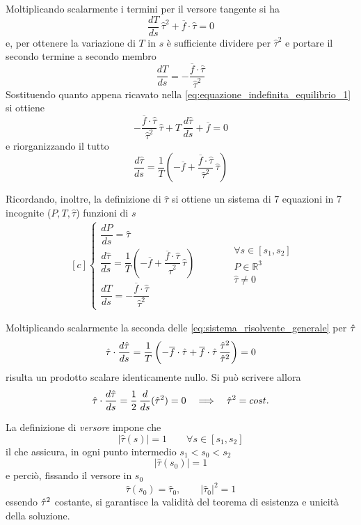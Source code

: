 Moltiplicando scalarmente i termini per il versore tangente si ha
\[
	\dfrac{dT}{ds}\,\hat{\tau}^2  + \overline{f}\cdot\hat{\tau} = 0
\]
e, per ottenere la variazione di $T$ in $s$ è sufficiente dividere per $\hat{\tau}^2$ e portare il secondo termine a secondo membro
\[
\dfrac{dT}{ds} = -\dfrac{\overline{f}\cdot\hat{\tau}}{\hat{\tau}^2}	
\]
Sostituendo quanto appena ricavato nella \eqref{eq:equazione_indefinita_equilibrio_1} si ottiene
\[
	-\dfrac{\overline{f}\cdot\hat{\tau}}{\hat{\tau}^2}\,\hat{\tau} + T\,\dfrac{d\hat{\tau}}{ds}+ \overline{f} = 0
\]
e riorganizzando il tutto
\[
\dfrac{d\hat{\tau}}{ds} = \dfrac{1}{T} \left(-\overline{f} + \dfrac{\overline{f}\cdot\hat{\tau}}{\hat{\tau}^2}\,\hat{\tau}\right)
\]

Ricordando, inoltre, la definizione di $\hat{\tau}$ si ottiene un sistema di 7 equazioni in 7 incognite ($P, T, \hat{\tau}$) funzioni di $s$
\begin{equation}
\label{eq:sistema_risolvente_generale}
	\begin{aligned}[c]
		\begin{cases}
			\dfrac{dP}{ds} = \hat{\tau}\\[2ex]
			\dfrac{d\hat{\tau}}{ds} = \dfrac{1}{T} \left(-\overline{f} + \dfrac{\overline{f}\cdot\hat{\tau}}{\hat{\tau}^2}\,\hat{\tau}\right)\\[2ex]
			\dfrac{dT}{ds} = -\dfrac{\overline{f}\cdot\hat{\tau}}{\hat{\tau}^2}
		\end{cases}
	\end{aligned}
	\qquad 
	\begin{aligned}
		&\forall s\in[s_1, s_2]\\
		& P\in\mathbb{R}^3\\
		&\hat{\tau} \neq 0
	\end{aligned}
\end{equation}

Moltiplicando scalarmente la seconda delle \eqref{eq:sistema_risolvente_generale} per $\hat{\tau}$ 
\[
 \hat{\tau}\cdot\dfrac{d\hat{\tau}}{ds} = \dfrac{1}{T}\left( -\overline{f}\cdot\hat{\tau} + \overline{f}\cdot\hat{\tau}\,\dfrac{\hat{\tau}^2}{\hat{\tau}^2}\right) = 0
\]
risulta un prodotto scalare identicamente nullo. Si può scrivere allora
\[
 \hat{\tau}\cdot\dfrac{d\hat{\tau}}{ds} = \dfrac{1}{2}\,\dfrac{d}{ds}(\hat{\tau}^2) = 0\quad \Longrightarrow\quad \hat{\tau}^2 = cost.
\]

La definizione di \emph{versore} impone che
\[
\left| \hat{\tau}(s)\right| = 1 \qquad \forall s\in[s_1, s_2]
\]
il che assicura, in ogni punto intermedio $s_1<s_0<s_2$
\[
	\left| \hat{\tau}(s_0)\right| = 1 
\]
e perciò, fissando il versore in $s_0$
\[
\hat{\tau}(s_0)= \hat{\tau}_0,\qquad \left|\hat{\tau}_0\right|^2 = 1
\]
essendo $\hat{\tau}^2$ costante, si garantisce la validità del teorema di esistenza e unicità della soluzione.

